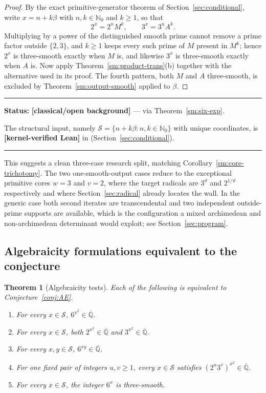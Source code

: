 \documentclass[11pt,oneside]{article}
\newtheorem{theorem}{Theorem}[section]
\theoremstyle{definition}
\theoremstyle{remark}
\newcommand{\Nzero}{\mathbb N_0}
\newcommand{\Abar}{\overline{\mathbb Q}}
\newcommand{\thetaq}{\vartheta}
\newcommand{\Sol}{\mathcal S}
\newcommand{\lean}[1]{\texttt{\detokenize{#1}}}
\newcommand{\statuslean}{\textcolor{leanblue}{\textbf{[kernel-verified Lean]}}}
\newcommand{\statusknown}{\textcolor{classicalgray}{\textbf{[classical/open background]}}}
\newenvironment{statusbox}[1]
{\begin{center}\begin{minipage}{0.94\textwidth}\raggedright\hbadness=10000\hrule
\vspace{0.45em}\textbf{Status:} #1\par\vspace{0.35em}}
{\vspace{0.35em}\hrule\end{minipage}\end{center}}
\begin{document}
\begin{proof}
By the exact primitive-generator theorem of Section~\ref{sec:conditional}, write
$x=n+k\beta$ with $n,k\in\Nzero$ and $k\ge1$, so that
\[
 2^x=2^nM^k,\qquad 3^x=3^nA^k .
\]
Multiplying by a power of the distinguished smooth prime cannot remove a prime factor
outside $\{2,3\}$, and $k\ge1$ keeps every such prime of $M$ present in $M^k$; hence $2^x$ is
three-smooth exactly when $M$ is, and likewise $3^x$ is three-smooth exactly when $A$ is.
Now apply Theorem~\ref{sm:product-trans}(b) together with the alternative used in its proof.
The fourth pattern, both $M$ and $A$ three-smooth, is excluded by
Theorem~\ref{sm:output-smooth} applied to $\beta$.
\end{proof}

\begin{statusbox}{\statusknown{} --- via Theorem~\ref{sm:six-exp}.}
The structural input, namely $\Sol=\{n+k\beta:n,k\in\Nzero\}$ with unique coordinates, is
\statuslean{} in \lean{PrimitiveGenerator} (Section~\ref{sec:conditional}).
\end{statusbox}

This suggests a clean three-case research split, matching
Corollary~\ref{sm:core-trichotomy}.  The two one-smooth-output cases reduce to the
exceptional primitive cores $w=3$ and $v=2$, where the target radicals are $3^{\thetaq}$ and
$2^{1/\thetaq}$ respectively and where Section~\ref{sec:radical} already locates the wall.
In the generic case both second iterates are transcendental and two independent
outside-prime supports are available, which is the configuration a mixed archimedean and
non-archimedean determinant would exploit; see Section~\ref{sec:program}.

\subsection{Algebraicity formulations equivalent to the conjecture}

\begin{theorem}[Algebraicity tests]
\label{sm:algebraicity}
Each of the following is equivalent to Conjecture~\ref{conj:AE}.
\begin{enumerate}[label=\textup{(\roman*)}]
\item For every $x\in\Sol$, $6^{x^2}\in\Abar$.
\item For every $x\in\Sol$, both $2^{x^2}\in\Abar$ and $3^{x^2}\in\Abar$.
\item For every $x,y\in\Sol$, $6^{xy}\in\Abar$.
\item For one fixed pair of integers $u,v\ge1$, every $x\in\Sol$ satisfies
$(2^u3^v)^{x^2}\in\Abar$.
\item For every $x\in\Sol$, the integer $6^x$ is three-smooth.
\end{enumerate}
\end{theorem}
\end{document}
